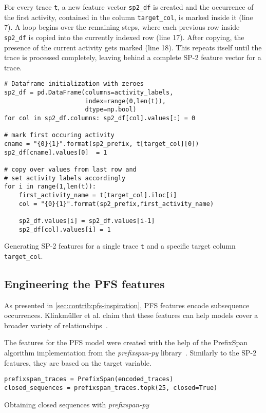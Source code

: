 For every trace \verb=t=, a new feature vector \verb=sp2_df= is created and the occurrence of the first activity, contained in the column \verb=target_col=, is marked inside it (line 7). A loop begins over the remaining steps, where each previous row inside \texttt{sp2\_df} is copied into the currently indexed row (line 17). After copying, the presence of the current activity gets marked (line 18). This repeats itself until the trace is processed completely, leaving behind a complete SP-2 feature vector for a trace.

\begin{listing}[ht]
\begin{verbatim}
# Dataframe initialization with zeroes
sp2_df = pd.DataFrame(columns=activity_labels,
                      index=range(0,len(t)),
                      dtype=np.bool)
for col in sp2_df.columns: sp2_df[col].values[:] = 0

# mark first occuring activity
cname = "{0}{1}".format(sp2_prefix, t[target_col][0])
sp2_df[cname].values[0]  = 1

# copy over values from last row and
# set activity labels accordingly
for i in range(1,len(t)):
    first_activity_name = t[target_col].iloc[i]
    col = "{0}{1}".format(sp2_prefix,first_activity_name)

    sp2_df.values[i] = sp2_df.values[i-1]
    sp2_df[col].values[i] = 1
\end{verbatim}
\caption{Generating SP-2 features for a single trace \texttt{t} and a specific target column \texttt{target\_col}.}
\label{lst:sp2-generation}
\end{listing}

\FloatBarrier
\subsection*{Engineering the PFS features}
As presented in \autoref{sec:contrib:pfs-inspiration}, PFS features encode subsequence occurrences. Klinkmüller et al. claim that these features can help models cover a broader variety of relationships~\cite{klinkmuller2018reliablemonitoring}.

The features for the PFS model were created with the help of the PrefixSpan algorithm implementation from the \textit{prefixspan-py} library~\cite{web:prefixspan-py}. Similarly to the SP-2 features, they are based on the target variable.

\begin{listing}[ht]
\begin{verbatim}
prefixspan_traces = PrefixSpan(encoded_traces)
closed_sequences = prefixspan_traces.topk(25, closed=True)
\end{verbatim}
\caption{Obtaining closed sequences with \textit{prefixspan-py}}
\label{lst:pfs-mining}
\end{listing}

